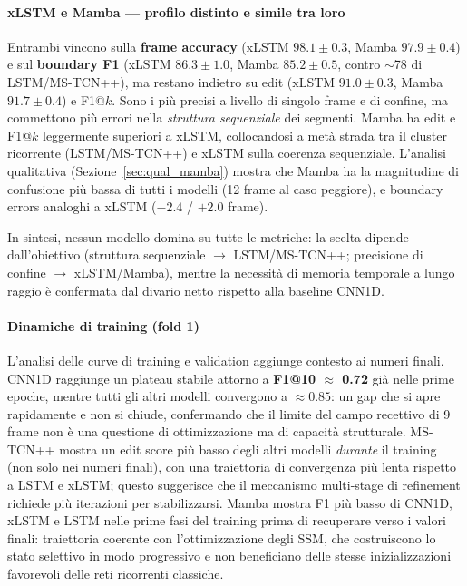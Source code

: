 \documentclass[12pt, a4paper]{article}
\begin{document}
\paragraph{xLSTM e Mamba --- profilo distinto e simile tra loro}
Entrambi vincono sulla \textbf{frame accuracy} (xLSTM $98.1 \pm 0.3$, Mamba
$97.9 \pm 0.4$) e sul \textbf{boundary F1} (xLSTM $86.3 \pm 1.0$, Mamba
$85.2 \pm 0.5$, contro $\sim$78 di LSTM/MS-TCN++), ma restano indietro su
edit (xLSTM $91.0 \pm 0.3$, Mamba $91.7 \pm 0.4$) e F1@$k$.
Sono i pi\`u precisi a livello di singolo frame e di confine, ma commettono
pi\`u errori nella \textit{struttura sequenziale} dei segmenti.
Mamba ha edit e F1@$k$ leggermente superiori a xLSTM, collocandosi a met\`a
strada tra il cluster ricorrente (LSTM/MS-TCN++) e xLSTM sulla coerenza
sequenziale. L'analisi qualitativa (Sezione~\ref{sec:qual_mamba}) mostra che
Mamba ha la magnitudine di confusione pi\`u bassa di tutti i modelli (12 frame
al caso peggiore), e boundary errors analoghi a xLSTM ($-2.4$ / $+2.0$ frame).

In sintesi, nessun modello domina su tutte le metriche: la scelta dipende
dall'obiettivo (struttura sequenziale $\to$ LSTM/MS-TCN++; precisione di
confine $\to$ xLSTM/Mamba), mentre la necessit\`a di memoria temporale a
lungo raggio \`e confermata dal divario netto rispetto alla baseline CNN1D.

\paragraph{Dinamiche di training (fold 1)}
L'analisi delle curve di training e validation aggiunge contesto ai numeri
finali. CNN1D raggiunge un plateau stabile attorno a \textbf{F1@10 $\approx$ 0.72}
gi\`a nelle prime epoche, mentre tutti gli altri modelli convergono a
$\approx 0.85$: un gap che si apre rapidamente e non si chiude, confermando
che il limite del campo recettivo di 9 frame non \`e una questione di
ottimizzazione ma di capacit\`a strutturale. MS-TCN++ mostra un edit score
pi\`u basso degli altri modelli \emph{durante} il training (non solo nei numeri
finali), con una traiettoria di convergenza pi\`u lenta rispetto a LSTM e xLSTM;
questo suggerisce che il meccanismo multi-stage di refinement richiede pi\`u
iterazioni per stabilizzarsi. Mamba mostra F1 pi\`u basso di CNN1D, xLSTM e
LSTM nelle prime fasi del training prima di recuperare verso i valori finali:
traiettoria coerente con l'ottimizzazione degli SSM, che costruiscono lo stato
selettivo in modo progressivo e non beneficiano delle stesse inizializzazioni
favorevoli delle reti ricorrenti classiche.
\end{document}
